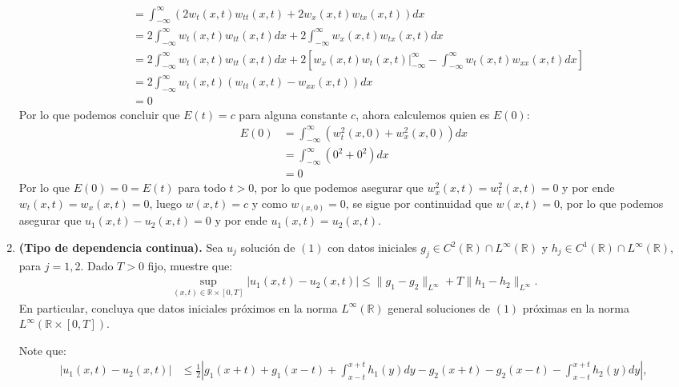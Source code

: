 \begin{homeworkProblem}
\begin{enumerate}[i]
\begin{solucion}
\begin{align*}
              &=\int_{-\infty}^{\infty}(2w_t(x,t)w_{tt}(x,t)+2w_x(x,t)w_{tx}(x,t))dx\\
              &=2\int_{-\infty}^{\infty}w_t(x,t)w_{tt}(x,t)dx + 2\int_{-\infty}^{\infty}w_x(x,t)w_{tx}(x,t)dx\\
              &=2\int_{-\infty}^{\infty}w_t(x,t)w_{tt}(x,t)dx + 2\left[ w_x(x,t)w_{t}(x,t)\Big|_{-\infty}^{\infty}-\int_{-\infty}^{\infty}w_t(x,t)w_{xx}(x,t)dx\right]\\
              &=2\int_{-\infty}^{\infty}w_t(x,t)(w_{tt}(x,t)-w_{xx}(x,t))dx\\
              &=0
            \end{align*}
            Por lo que podemos concluir que $E(t)=c$ para alguna constante $c$, ahora calculemos quien es $E(0)$:
            \begin{align*}
              E(0)&=\int_{-\infty}^{\infty}(w_t^2(x,0)+w_x^2(x,0))dx\\
              &=\int_{-\infty}^{\infty}(0^2+0^2)dx\\
              &=0
            \end{align*}
            Por lo que $E(0)=0=E(t)$ para todo $t>0$, por lo que podemos asegurar que $w_x^2(x,t)=w_t^2(x,t)=0$ y por ende $w_t(x,t)=w_x(x,t)=0$, luego $w(x,t)=c$ y como $w_(x,0)=0$, se sigue por continuidad que $w(x,t)=0$, por lo que podemos asegurar que $u_1(x,t)-u_2(x,t)=0$ y por ende $u_1(x,t)=u_2(x,t)$.
            \demostrado
      \end{solucion}
      \newpage
    \item \textbf{(Tipo de dependencia continua).} Sea $u_j$ solución de $(1)$ con datos iniciales $g_j\in C^2(\mathbb{R})\cap L^{\infty}(\mathbb{R})$ y $h_j\in C^{1}(\mathbb{R})\cap L^{\infty}(\mathbb{R})$, para $j=1,2$. Dado $T>0$ fijo, muestre que:
    \begin{align*}
      \sup_{(x,t)\in \mathbb{R}\times [0,T]}|u_1(x,t)-u_2(x,t)|\leq \|g_1-g_2\|_{L^{\infty}}+T\|h_1-h_2\|_{L^{\infty}}.
    \end{align*}
    En particular, concluya que datos iniciales próximos en la norma $L^{\infty}(\mathbb{R})$ general soluciones de $(1)$ próximas en la norma $L^{\infty}(\mathbb{R}\times [0,T])$.
      \begin{solucion}
        Note que:
        \begin{align*}
          |u_1(x,t)-u_2(x,t)|&\leq \frac{1}{2}\left|g_1(x+t)+g_1(x-t)+\int_{x-t}^{x+t}h_1(y)dy-g_2(x+t)-g_2(x-t)-\int_{x-t}^{x+t}h_2(y)dy\right|,\\

\end{align*}
\end{solucion}
\end{enumerate}
\end{homeworkProblem}
